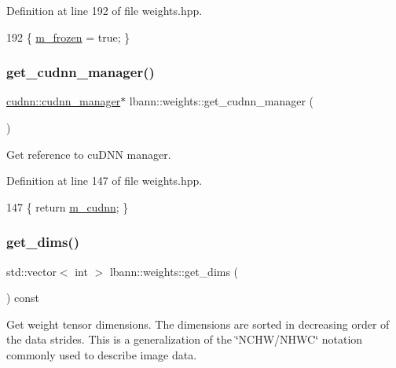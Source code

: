 Definition at line 192 of file weights.\+hpp.


\begin{DoxyCode}
192 \{ \hyperlink{classlbann_1_1weights_a3962305112ba98ef2eb89c6f7035f6dd}{m\_frozen} = \textcolor{keyword}{true}; \}
\end{DoxyCode}
\mbox{\label{classlbann_1_1weights_ab8c007f217040d2c4a99acc1977d9d54}} 
\subsubsection{\texorpdfstring{get\+\_\+cudnn\+\_\+manager()}{get\_cudnn\_manager()}}
{\footnotesize\ttfamily \hyperlink{classlbann_1_1cudnn_1_1cudnn__manager}{cudnn\+::cudnn\+\_\+manager}$\ast$ lbann\+::weights\+::get\+\_\+cudnn\+\_\+manager (\begin{DoxyParamCaption}{ }\end{DoxyParamCaption})\hspace{0.3cm}{\ttfamily [inline]}}

Get reference to cu\+D\+NN manager. 

Definition at line 147 of file weights.\+hpp.


\begin{DoxyCode}
147 \{ \textcolor{keywordflow}{return} \hyperlink{classlbann_1_1weights_a873e8c14998915e442d03b8dd7d2fdf7}{m\_cudnn}; \}
\end{DoxyCode}
\mbox{\label{classlbann_1_1weights_ac1f4e6725fc8b265e0ed5dfe140a321a}} 
\subsubsection{\texorpdfstring{get\+\_\+dims()}{get\_dims()}}
{\footnotesize\ttfamily std\+::vector$<$ int $>$ lbann\+::weights\+::get\+\_\+dims (\begin{DoxyParamCaption}{ }\end{DoxyParamCaption}) const}

Get weight tensor dimensions. The dimensions are sorted in decreasing order of the data strides. This is a generalization of the \char`\"{}\+N\+C\+H\+W/\+N\+H\+W\+C\char`\"{} notation commonly used to describe image data.

